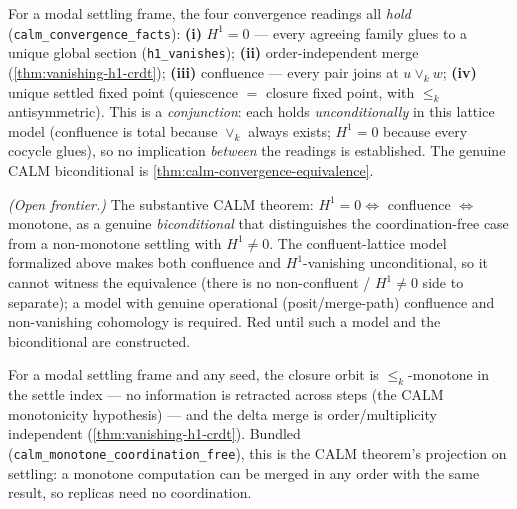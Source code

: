 \begin{theorem}\label{thm:calm-convergence-facts}\leanok{}
For a modal settling frame, the four convergence readings all \emph{hold} (\texttt{calm\_convergence\_facts}): \textbf{(i)} $H^1 = 0$ --- every agreeing family glues to a unique global section (\texttt{h1\_vanishes}); \textbf{(ii)} order-independent merge (\cref{thm:vanishing-h1-crdt}); \textbf{(iii)} confluence --- every pair joins at $u \vee_k w$; \textbf{(iv)} unique settled fixed point (quiescence $=$ closure fixed point, with $\leq_k$ antisymmetric). This is a \emph{conjunction}: each holds \emph{unconditionally} in this lattice model (confluence is total because $\vee_k$ always exists; $H^1 = 0$ because every cocycle glues), so no implication \emph{between} the readings is established. The genuine CALM biconditional is \cref{thm:calm-convergence-equivalence}.
\end{theorem}
\begin{theorem}\label{thm:calm-convergence-equivalence}\notready{}
\emph{(Open frontier.)} The substantive CALM theorem: $H^1 = 0 \iff$ confluence $\iff$ monotone, as a genuine \emph{biconditional} that distinguishes the coordination-free case from a non-monotone settling with $H^1 \neq 0$. The confluent-lattice model formalized above makes both confluence and $H^1$-vanishing unconditional, so it cannot witness the equivalence (there is no non-confluent / $H^1 \neq 0$ side to separate); a model with genuine operational (posit/merge-path) confluence and non-vanishing cohomology is required. Red until such a model and the biconditional are constructed.
\end{theorem}
\begin{theorem}\label{thm:calm-monotone}\leanok{}
For a modal settling frame and any seed, the closure orbit is $\leq_k$-monotone in the settle index --- no information is retracted across steps (the CALM monotonicity hypothesis) --- and the delta merge is order/multiplicity independent (\cref{thm:vanishing-h1-crdt}). Bundled (\texttt{calm\_monotone\_coordination\_free}), this is the CALM theorem's projection on settling: a monotone computation can be merged in any order with the same result, so replicas need no coordination.
\end{theorem}
